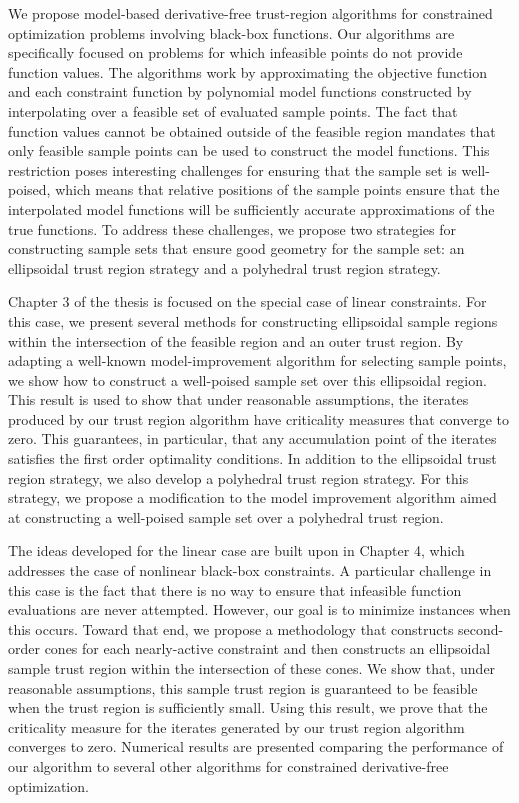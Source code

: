 
 \begin{RaggedRight}
We propose model-based derivative-free trust-region algorithms for constrained optimization problems involving black-box functions.
Our algorithms are specifically focused on problems for which infeasible points do not provide function values.
The algorithms work by approximating the objective function and each constraint function by polynomial model functions 
constructed by interpolating over a feasible set of evaluated sample points.
The fact that function values cannot be obtained outside of the feasible region mandates that 
only feasible sample points can be used to construct the model functions.
This restriction poses interesting challenges for ensuring that the sample set is well-poised, 
which means that relative positions of the sample points ensure that the interpolated model functions will be
sufficiently accurate approximations of the true functions.
To address these challenges, we propose two strategies for constructing sample sets that ensure good geometry for the sample set: 
an ellipsoidal trust region strategy and a polyhedral trust region strategy.   

Chapter 3 of the thesis is focused on the special case of linear constraints.
For this case, we present several methods for constructing ellipsoidal sample regions within the intersection of the feasible region and an outer trust region.
By adapting a well-known model-improvement algorithm for selecting sample points,
we show how to construct a well-poised sample set over this ellipsoidal region.
This result is used to show that under reasonable assumptions,  
the iterates produced by our trust region algorithm have criticality measures that converge to zero.
This guarantees, in particular, that any accumulation point of the iterates satisfies the first order optimality conditions.
In addition to the ellipsoidal trust region strategy, we also develop a polyhedral trust region strategy.
For this strategy, we propose a modification to the model improvement algorithm aimed at constructing a well-poised sample set over 
a polyhedral trust region.

The ideas developed for the linear case are built upon in Chapter 4, which addresses the case of nonlinear black-box constraints.
A particular challenge in this case is the fact that there is no way to ensure that infeasible function evaluations are never attempted.
However, our goal is to minimize instances when this occurs.
Toward that end, we propose a methodology that constructs second-order cones for each nearly-active constraint 
and then constructs an ellipsoidal sample trust region within the intersection of these cones.
We show that, under reasonable assumptions, this sample trust region is guaranteed to be feasible when the trust region is sufficiently small.
Using this result, we prove that the criticality measure for the iterates generated by our trust region algorithm converges to zero.
Numerical results are presented comparing the performance of our algorithm to several other algorithms for constrained derivative-free optimization.
 \end{RaggedRight}

